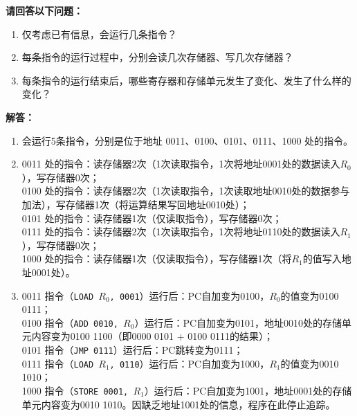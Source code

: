 \documentclass[12pt, a4paper]{ctexart}
\begin{document}
\textbf{请回答以下问题：}
\begin{enumerate}[label=（\arabic*）, itemsep=4pt, parsep=0pt]
    \item 仅考虑已有信息，会运行几条指令？
    \item 每条指令的运行过程中，分别会读几次存储器、写几次存储器？
    \item 每条指令的运行结束后，哪些寄存器和存储单元发生了变化、发生了什么样的变化？
\end{enumerate}

\textbf{解答：}
\begin{enumerate}[label=（\arabic*）, itemsep=4pt, parsep=0pt]
    \item 会运行5条指令，分别是位于地址 0011、0100、0101、0111、1000 处的指令。
    \item 
    0011 处的指令：读存储器2次（1次读取指令，1次将地址0001处的数据读入$R_0$），写存储器0次；\\
    0100 处的指令：读存储器2次（1次读取指令，1次读取地址0010处的数据参与加法），写存储器1次（将运算结果写回地址0010处）；\\
    0101 处的指令：读存储器1次（仅读取指令），写存储器0次；\\
    0111 处的指令：读存储器2次（1次读取指令，1次将地址0110处的数据读入$R_1$），写存储器0次；\\
    1000 处的指令：读存储器1次（仅读取指令），写存储器1次（将$R_1$的值写入地址0001处）。
    \item 
    0011 指令（\texttt{LOAD $R_0$, 0001}）运行后：PC自加变为0100，$R_0$的值变为0100 0111；\\
    0100 指令（\texttt{ADD 0010, $R_0$}）运行后：PC自加变为0101，地址0010处的存储单元内容变为0100 1100（即0000 0101 + 0100 0111的结果）；\\
    0101 指令（\texttt{JMP 0111}）运行后：PC跳转变为0111；\\
    0111 指令（\texttt{LOAD $R_1$, 0110}）运行后：PC自加变为1000，$R_1$的值变为0010 1010；\\
    1000 指令（\texttt{STORE 0001, $R_1$}）运行后：PC自加变为1001，地址0001处的存储单元内容变为0010 1010。因缺乏地址1001处的信息，程序在此停止追踪。
\end{enumerate}
\end{document}

